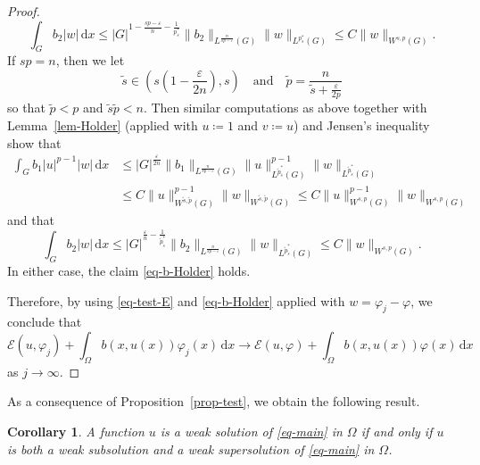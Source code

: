 \documentclass[11pt]{amsart}
\theoremstyle{plain}
\newtheorem{corollary}[theorem]{Corollary}
\theoremstyle{definition}
\numberwithin{equation}{section}
\begin{document}
\begin{proof}
\begin{equation*}
    \int_G b_2|w| \,\mathrm{d}x
    \leq |G|^{1-\frac{sp-\varepsilon}{n}-\frac{1}{p^{\ast}_s}} \|b_2\|_{L^{\frac{n}{sp-\varepsilon}}(G)} \|w\|_{L^{p^{\ast}_s}(G)}
    \leq C \|w\|_{W^{s, p}(G)}.
\end{equation*}
If $sp=n$, then we let
\begin{equation}\label{eq-sp}
\tilde{s} \in \left( s\left(1-\frac{\varepsilon}{2n}\right), s \right) \quad\text{and}\quad \tilde{p}=\frac{n}{\tilde{s}+\frac{\varepsilon}{2p}}
\end{equation}
so that $\tilde{p}<p$ and $\tilde{s}\tilde{p}<n$. Then similar computations as above together with Lemma~\ref{lem-Holder} (applied with $u\coloneqq 1$ and $v\coloneqq u$) and Jensen's inequality show that
\begin{equation*}
\begin{split}
    \int_{G} b_1|u|^{p-1}|w| \,\mathrm{d}x
    &\leq |G|^{\frac{\varepsilon}{2n}} \|b_1\|_{L^{\frac{n}{sp-\varepsilon}}(G)} \|u\|_{L^{\tilde{p}^{\ast}_{\tilde{s}}}(G)}^{p-1} \|w\|_{L^{\tilde{p}^{\ast}_{\tilde{s}}}(G)} \\
    &\leq C \|u\|_{W^{\tilde{s}, \tilde{p}}(G)}^{p-1} \|w\|_{W^{\tilde{s}, \tilde{p}}(G)} \leq C \|u\|_{W^{s, p}(G)}^{p-1} \|w\|_{W^{s, p}(G)}
\end{split}
\end{equation*}
and that
\begin{equation*}
    \int_G b_2|w| \,\mathrm{d}x
    \leq |G|^{\frac{\varepsilon}{n}-\frac{1}{\tilde{p}^{\ast}_{\tilde{s}}}} \|b_2\|_{L^{\frac{n}{sp-\varepsilon}}(G)} \|w\|_{L^{\tilde{p}^{\ast}_{\tilde{s}}}(G)} \leq C \|w\|_{W^{s, p}(G)}.
\end{equation*}
In either case, the claim \eqref{eq-b-Holder} holds.

Therefore, by using \eqref{eq-test-E} and \eqref{eq-b-Holder} applied with $w=\varphi_j-\varphi$, we conclude that
\begin{equation*}
\mathcal{E}(u, \varphi_j) + \int_\Omega b(x, u(x))\varphi_j(x) \,\mathrm{d}x \to \mathcal{E}(u, \varphi) + \int_\Omega b(x, u(x))\varphi(x) \,\mathrm{d}x
\end{equation*}
as $j \to \infty$.
\end{proof}

As a consequence of Proposition~\ref{prop-test}, we obtain the following result.

\begin{corollary}\label{cor-sol}
A function $u$ is a weak solution of \eqref{eq-main} in $\Omega$ if and only if $u$ is both a weak subsolution and a weak supersolution of \eqref{eq-main} in $\Omega$.
\end{corollary}
\end{document}
